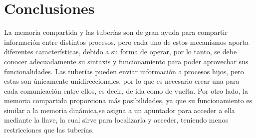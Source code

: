 \documentclass[12pt]{article}
\begin{document}
  \section{Conclusiones}
    La memoria compartida y las tuberías son de gran ayuda para compartir información entre distintos procesos, pero cada uno de estos mecanismos aporta diferentes características, debido a su forma de operar, por lo tanto, se debe conocer adecuadamente su sintaxis y funcionamiento para poder aprovechar sus funcionalidades. Las tuberías pueden enviar información a procesos hijos, pero estas son únicamente unidireccionales, por lo que es necesario crear una para cada comunicación entre ellos, es decir, de ida como de vuelta. Por otro lado, la memoria compartida proporciona más posibilidades, ya que su funcionamiento es similar a la memoria dinámica,se asigna a un apuntador para acceder a ella mediante la llave, la cual sirve para localizarla y acceder, teniendo menos restricciones que las tuberías.
\end{document}
